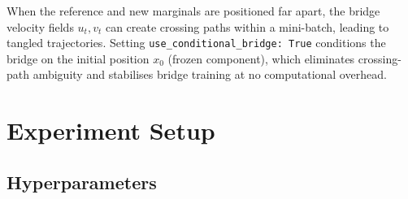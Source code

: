\documentclass[11pt]{article}
\theoremstyle{definition}
\numberwithin{equation}{section}%
\begin{document}
When the reference and new marginals are positioned far apart, the bridge
velocity fields $u_t, v_t$ can create crossing paths within a mini-batch,
leading to tangled trajectories. Setting \texttt{use\_conditional\_bridge:
True} conditions the bridge on the initial position $x_0$ (frozen
component), which eliminates crossing-path ambiguity and stabilises bridge
training at no computational overhead.


\begin{table}[ht]
\centering
\caption{\textbf{Positioning of our method relative to existing methods.}
$\checkmark$ = satisfies the criterion; $\times$ = does not.}
\label{tab:positioning}
\end{table}



% 
\section{Experiment Setup}
\label{app:setup}
% 

\subsection{Hyperparameters}
\label{app:hyperparams}
\end{document}
